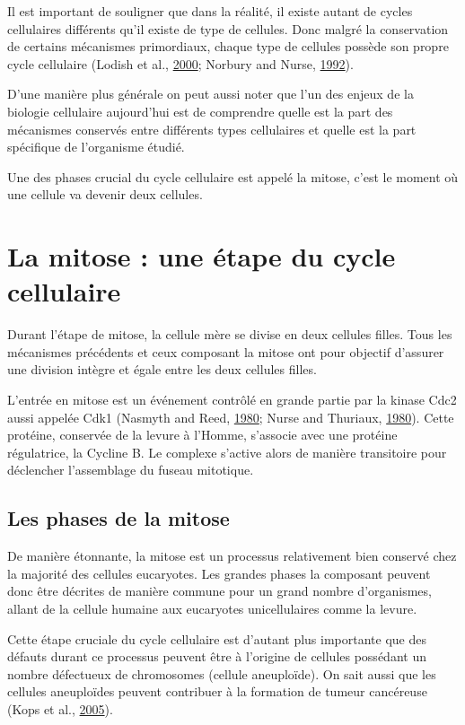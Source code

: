 \documentclass[12pt,a4paper,twoside,openright]{book}
\begin{document}
Il est important de souligner que dans la réalité, il existe autant de
cycles cellulaires différents qu'il existe de type de cellules. Donc
malgré la conservation de certains mécanismes primordiaux, chaque type
de cellules possède son propre cycle cellulaire (Lodish et al.,
\protect\hyperlink{ref-Lodish2000}{2000}; Norbury and Nurse,
\protect\hyperlink{ref-Norbury1992}{1992}).

D'une manière plus générale on peut aussi noter que l'un des enjeux de
la biologie cellulaire aujourd'hui est de comprendre quelle est la part
des mécanismes conservés entre différents types cellulaires et quelle
est la part spécifique de l'organisme étudié.

Une des phases crucial du cycle cellulaire est appelé la mitose, c'est
le moment où une cellule va devenir deux cellules.

\section{La mitose : une étape du cycle
cellulaire}\label{la-mitose-une-uxe9tape-du-cycle-cellulaire}

Durant l'étape de mitose, la cellule mère se divise en deux cellules
filles. Tous les mécanismes précédents et ceux composant la mitose ont
pour objectif d'assurer une division intègre et égale entre les deux
cellules filles.

L'entrée en mitose est un événement contrôlé en grande partie par la
kinase Cdc2 aussi appelée Cdk1 (Nasmyth and Reed,
\protect\hyperlink{ref-Nasmyth1980}{1980}; Nurse and Thuriaux,
\protect\hyperlink{ref-Nurse1980}{1980}). Cette protéine, conservée de
la levure à l'Homme, s'associe avec une protéine régulatrice, la Cycline
B. Le complexe s'active alors de manière transitoire pour déclencher
l'assemblage du fuseau mitotique.

\subsection{Les phases de la mitose}\label{les-phases-de-la-mitose}

De manière étonnante, la mitose est un processus relativement bien
conservé chez la majorité des cellules eucaryotes. Les grandes phases la
composant peuvent donc être décrites de manière commune pour un grand
nombre d'organismes, allant de la cellule humaine aux eucaryotes
unicellulaires comme la levure.

Cette étape cruciale du cycle cellulaire est d'autant plus importante
que des défauts durant ce processus peuvent être à l'origine de cellules
possédant un nombre défectueux de chromosomes (cellule aneuploïde). On
sait aussi que les cellules aneuploïdes peuvent contribuer à la
formation de tumeur cancéreuse (Kops et al.,
\protect\hyperlink{ref-Kops2005}{2005}).
\end{document}
